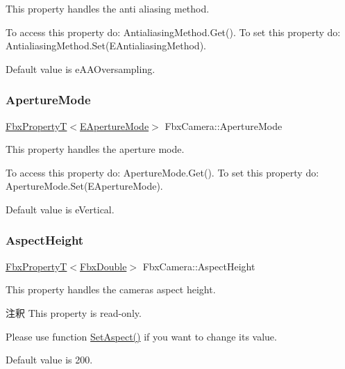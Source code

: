 This property handles the anti aliasing method.

To access this property do\+: Antialiasing\+Method.\+Get(). To set this property do\+: Antialiasing\+Method.\+Set(\+E\+Antialiasing\+Method).

Default value is e\+A\+A\+Oversampling. \mbox{\label{class_fbx_camera_afa8019b2027da3798e13bb1126c5941d}} 
\subsubsection{\texorpdfstring{Aperture\+Mode}{ApertureMode}}
{\footnotesize\ttfamily \hyperlink{class_fbx_property_t}{Fbx\+PropertyT}$<$\hyperlink{class_fbx_camera_addeea6fc943ce5f087dbc54c142f890e}{E\+Aperture\+Mode}$>$ Fbx\+Camera\+::\+Aperture\+Mode}

This property handles the aperture mode.

To access this property do\+: Aperture\+Mode.\+Get(). To set this property do\+: Aperture\+Mode.\+Set(\+E\+Aperture\+Mode).

Default value is e\+Vertical. \mbox{\label{class_fbx_camera_aabeade4a36213c65d7a4f45aeceebff6}} 
\subsubsection{\texorpdfstring{Aspect\+Height}{AspectHeight}}
{\footnotesize\ttfamily \hyperlink{class_fbx_property_t}{Fbx\+PropertyT}$<$\hyperlink{fbxtypes_8h_a171e72a1c46fc15c1a6c9c31948c1c5b}{Fbx\+Double}$>$ Fbx\+Camera\+::\+Aspect\+Height}

This property handles the camera\textquotesingle{}s aspect height.

\begin{DoxyRemark}{注釈}
This property is read-\/only. 

Please use function \hyperlink{class_fbx_camera_adb9cf67e4b59463add6a052003797392}{Set\+Aspect()} if you want to change its value.
\end{DoxyRemark}
Default value is 200. \mbox{\label{class_fbx_camera_ad140535acab4a663a6f4cb51ef603e7a}} 
